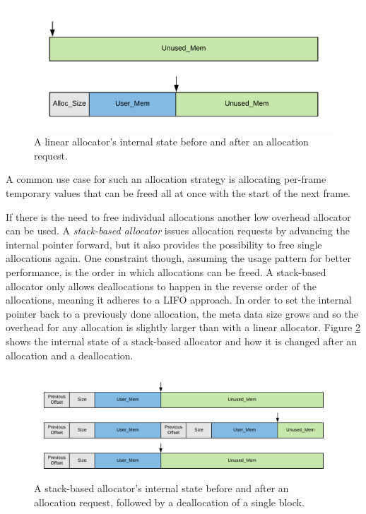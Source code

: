 \begin{figure}[h!]
	\centering \includegraphics[width=\linewidth]{PICs/linear_alloc.png}
	\caption{A linear allocator's internal state before and after an allocation request.}
	\label{fig:linear_alloc}
\end{figure}

\noindent
A common use case for such an allocation strategy is allocating per-frame temporary values that can be freed all at once with the start of the next frame. 

If there is the need to free individual allocations another low overhead allocator can be used. A \textit{stack-based allocator} issues allocation requests by advancing the internal pointer forward, but it also provides the possibility to free single allocations again. One constraint though, assuming the usage pattern for better performance, is the order in which allocations can be freed. A stack-based allocator only allows deallocations to happen in the reverse order of the allocations, meaning it adheres to a \ac{LIFO} approach. In order to set the internal pointer back to a previously done allocation, the meta data size grows and so the overhead for any allocation is slightly larger than with a linear allocator. Figure \ref{fig:stack_alloc} shows the internal state of a stack-based allocator and how it is changed after an allocation and a deallocation.

\begin{figure}[h!]
	\centering \includegraphics[width=\linewidth]{PICs/stack_alloc.png}
	\caption{A stack-based allocator's internal state before and after an allocation request, followed by a deallocation of a single block.}
	\label{fig:stack_alloc}
\end{figure}

